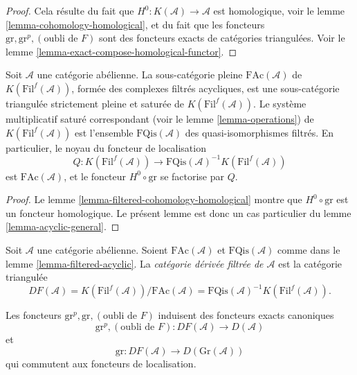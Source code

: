 \begin{proof}
Cela résulte du fait que $H^0 : K(\mathcal{A}) \to \mathcal{A}$ est
homologique, voir le lemme \ref{lemma-cohomology-homological}, et du fait que
les foncteurs $\text{gr}, \text{gr}^p, (\text{oubli de }F)$ sont des
foncteurs exacts de catégories triangulées. Voir le
lemme \ref{lemma-exact-compose-homological-functor}.
\end{proof}

\begin{lemma}
\label{lemma-filtered-acyclic}
Soit $\mathcal{A}$ une catégorie abélienne. La sous-catégorie pleine
$\text{FAc}(\mathcal{A})$ de $K(\text{Fil}^f(\mathcal{A}))$, formée des
complexes filtrés acycliques, est une sous-catégorie triangulée strictement
pleine et saturée de $K(\text{Fil}^f(\mathcal{A}))$. Le système multiplicatif
saturé correspondant (voir le lemme \ref{lemma-operations}) de
$K(\text{Fil}^f(\mathcal{A}))$ est l'ensemble $\text{FQis}(\mathcal{A})$ des
quasi-isomorphismes filtrés. En particulier, le noyau du foncteur de
localisation
$$
Q :
K(\text{Fil}^f(\mathcal{A}))
\longrightarrow
\text{FQis}(\mathcal{A})^{-1}K(\text{Fil}^f(\mathcal{A}))
$$
est $\text{FAc}(\mathcal{A})$, et le foncteur
$H^0 \circ \text{gr}$ se factorise par $Q$.
\end{lemma}

\begin{proof}
Le lemme \ref{lemma-filtered-cohomology-homological} montre que
$H^0 \circ \text{gr}$ est un foncteur homologique. Le présent lemme est donc un
cas particulier du lemme \ref{lemma-acyclic-general}.
\end{proof}

\begin{definition}
\label{definition-filtered-derived}
Soit $\mathcal{A}$ une catégorie abélienne. Soient
$\text{FAc}(\mathcal{A})$ et $\text{FQis}(\mathcal{A})$ comme dans le
lemme \ref{lemma-filtered-acyclic}. La
{\it catégorie dérivée filtrée de $\mathcal{A}$} est la catégorie triangulée
$$
DF(\mathcal{A}) =
K(\text{Fil}^f(\mathcal{A}))/\text{FAc}(\mathcal{A}) =
\text{FQis}(\mathcal{A})^{-1} K(\text{Fil}^f(\mathcal{A})).
$$
\end{definition}

\begin{lemma}
\label{lemma-filtered-derived-functors}
Les foncteurs $\text{gr}^p, \text{gr}, (\text{oubli de }F)$ induisent
des foncteurs exacts canoniques
$$
\text{gr}^p, (\text{oubli de }F):
DF(\mathcal{A})
\longrightarrow
D(\mathcal{A})
$$
et
$$
\text{gr}:
DF(\mathcal{A})
\longrightarrow
D(\text{Gr}(\mathcal{A}))
$$
qui commutent aux foncteurs de localisation.
\end{lemma}

